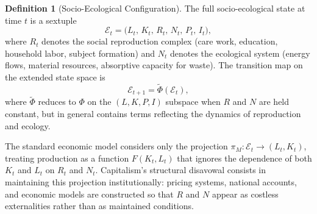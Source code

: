 \documentclass[12pt,a4paper]{article}
\theoremstyle{definition}
\newtheorem{definition}{Definition}[section]
\theoremstyle{remark}
\begin{document}
\begin{definition}[Socio-Ecological Configuration]
The full socio-ecological state at time $t$ is a sextuple
\begin{equation}
  \label{eq:full_state}
  \mathcal{E}_t = \bigl(L_t,\, K_t,\, R_t,\, N_t,\, P_t,\, I_t\bigr),
\end{equation}
where $R_t$ denotes the social reproduction complex (care work, education, household labor, subject formation) and $N_t$ denotes the ecological system (energy flows, material resources, absorptive capacity for waste). The transition map on the extended state space is
\begin{equation}
  \mathcal{E}_{t+1} = \tilde{\Phi}(\mathcal{E}_t),
\end{equation}
where $\tilde{\Phi}$ reduces to $\Phi$ on the $(L,K,P,I)$ subspace when $R$ and $N$ are held constant, but in general contains terms reflecting the dynamics of reproduction and ecology.
\end{definition}

The standard economic model considers only the projection $\pi_M : \mathcal{E}_t \to (L_t, K_t)$, treating production as a function $F(K_t, L_t)$ that ignores the dependence of both $K_t$ and $L_t$ on $R_t$ and $N_t$. Capitalism's structural disavowal consists in maintaining this projection institutionally: pricing systems, national accounts, and economic models are constructed so that $R$ and $N$ appear as costless externalities rather than as maintained conditions.
\end{document}
